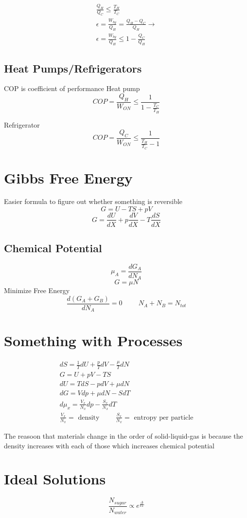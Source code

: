 \documentclass[fleqn]{report}
\newcommand{\hp}{\hspace{1cm}}
\newcommand{\equations}[1]{
\begin{gather*}
#1
\end{gather*}
}
\begin{document}
\equations{
\frac{Q_H}{Q_C} \leq \frac{T_H}{T_C}
\\
\epsilon = \frac{W_{by}}{Q_H} = \frac{Q_H - Q_C}{Q_H} \rightarrow
\\
\epsilon = \frac{W_{by}}{Q_H} \leq 1 - \frac{Q_C}{Q_H}
}

\subsection{Heat Pumps/Refrigerators}
COP is coefficient of performance 
Heat pump
\[
COP = \frac{Q_H}{W_{ON}} \leq \frac{1}{1 - \frac{T_C}{T_H}}
\]

Refrigerator
\[
COP = \frac{Q_C}{W_{ON}} \leq \frac{1}{\frac{T_H}{T_C} - 1}
\]

\section{Gibbs Free Energy}
Easier formula to figure out whether something is reversible
\[
G = U - T S + pV
\]
\[
G = \frac{dU}{dX} + p \frac{dV}{dX} - T\frac{dS}{dX}
\]

\subsection{Chemical Potential}
\[
\mu_A = \frac{dG_A}{dN_A}
\]
\[
G = \mu N
\]
Minimize Free Energy
\[
\frac{d(G_A + G_B)}{dN_A} = 0
\hp
N_A + N_B = N_{tot}
\]

\section{Something with Processes}
\equations{
dS = \frac{1}{T} dU + \frac{p}{T} dV - \frac{\mu}{T} dN
\\
G = U + pV - TS
\\
dU = TdS - pdV + \mu dN
\\
dG = Vdp + \mu dN - S dT
\\
d \mu_x = \frac{V_x}{N_x} dp - \frac{S_x}{N_x} dT
\\
\frac{V_x}{N_x} = \textrm{ density}
\hp
\frac{S_x}{N_x} = \textrm{ entropy per particle}
}
The reasoon that materials change in the order of solid-liquid-gas is because the density increases with each of those which increases chemical potential

\section{Ideal Solutions}
\[
\frac{N_{sugar}}{N_{water}} \propto e^{\frac{\Delta}{kT}}
\]
\end{document}
